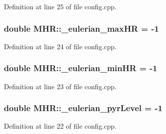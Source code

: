 Definition at line 25 of file config.\+cpp.

\hypertarget{namespace_m_h_r_acb647c6b44ad0c7fac0fba37122d5889}{
\subsubsection[{\+\_\+eulerian\+\_\+max\+H\+R}]{\setlength{\rightskip}{0pt plus 5cm}double M\+H\+R\+::\+\_\+eulerian\+\_\+max\+H\+R = -\/1}}\label{namespace_m_h_r_acb647c6b44ad0c7fac0fba37122d5889}


Definition at line 24 of file config.\+cpp.

\hypertarget{namespace_m_h_r_afe8a788bdd0504a98259321e41377180}{
\subsubsection[{\+\_\+eulerian\+\_\+min\+H\+R}]{\setlength{\rightskip}{0pt plus 5cm}double M\+H\+R\+::\+\_\+eulerian\+\_\+min\+H\+R = -\/1}}\label{namespace_m_h_r_afe8a788bdd0504a98259321e41377180}


Definition at line 23 of file config.\+cpp.

\hypertarget{namespace_m_h_r_a383bea7ba431fede0a30f05b3ae57536}{
\subsubsection[{\+\_\+eulerian\+\_\+pyr\+Level}]{\setlength{\rightskip}{0pt plus 5cm}double M\+H\+R\+::\+\_\+eulerian\+\_\+pyr\+Level = -\/1}}\label{namespace_m_h_r_a383bea7ba431fede0a30f05b3ae57536}


Definition at line 22 of file config.\+cpp.

